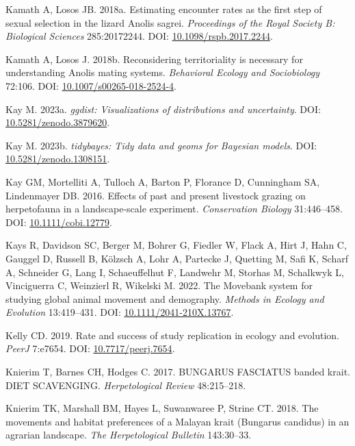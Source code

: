 \documentclass[10pt,a4paper]{article}
\newlength{\cslhangindent}
\newenvironment{CSLReferences}[2] %
 {\begin{list}{}{%
  \setlength{\itemindent}{0pt}
  \setlength{\leftmargin}{0pt}
  \setlength{\parsep}{0pt}
  \ifodd #1
   \setlength{\leftmargin}{\cslhangindent}
   \setlength{\itemindent}{-1\cslhangindent}
  \fi
  \setlength{\itemsep}{#2\baselineskip}}}
 {\end{list}}
\begin{document}
\begin{CSLReferences}{1}{0}
Kamath A, Losos JB. 2018a. Estimating encounter rates as the first step of sexual selection in the lizard {Anolis} sagrei. \emph{Proceedings of the Royal Society B: Biological Sciences} 285:20172244. DOI: \href{https://doi.org/10.1098/rspb.2017.2244}{10.1098/rspb.2017.2244}.

Kamath A, Losos J. 2018b. Reconsidering territoriality is necessary for understanding {Anolis} mating systems. \emph{Behavioral Ecology and Sociobiology} 72:106. DOI: \href{https://doi.org/10.1007/s00265-018-2524-4}{10.1007/s00265-018-2524-4}.

Kay M. 2023a. \emph{{ggdist}: Visualizations of distributions and uncertainty}. DOI: \href{https://doi.org/10.5281/zenodo.3879620}{10.5281/zenodo.3879620}.

Kay M. 2023b. \emph{{tidybayes}: Tidy data and geoms for {Bayesian} models}. DOI: \href{https://doi.org/10.5281/zenodo.1308151}{10.5281/zenodo.1308151}.

Kay GM, Mortelliti A, Tulloch A, Barton P, Florance D, Cunningham SA, Lindenmayer DB. 2016. Effects of past and present livestock grazing on herpetofauna in a landscape-scale experiment. \emph{Conservation Biology} 31:446--458. DOI: \href{https://doi.org/10.1111/cobi.12779}{10.1111/cobi.12779}.

Kays R, Davidson SC, Berger M, Bohrer G, Fiedler W, Flack A, Hirt J, Hahn C, Gauggel D, Russell B, Kölzsch A, Lohr A, Partecke J, Quetting M, Safi K, Scharf A, Schneider G, Lang I, Schaeuffelhut F, Landwehr M, Storhas M, Schalkwyk L, Vinciguerra C, Weinzierl R, Wikelski M. 2022. The {Movebank} system for studying global animal movement and demography. \emph{Methods in Ecology and Evolution} 13:419--431. DOI: \href{https://doi.org/10.1111/2041-210X.13767}{10.1111/2041-210X.13767}.

Kelly CD. 2019. Rate and success of study replication in ecology and evolution. \emph{PeerJ} 7:e7654. DOI: \href{https://doi.org/10.7717/peerj.7654}{10.7717/peerj.7654}.

Knierim T, Barnes CH, Hodges C. 2017. BUNGARUS FASCIATUS banded krait. DIET SCAVENGING. \emph{Herpetological Review} 48:215--218.

Knierim TK, Marshall BM, Hayes L, Suwanwaree P, Strine CT. 2018. The movements and habitat preferences of a {Malayan} krait ({Bungarus} candidus) in an agrarian landscape. \emph{The Herpetological Bulletin} 143:30--33.


\end{CSLReferences}
\end{document}
